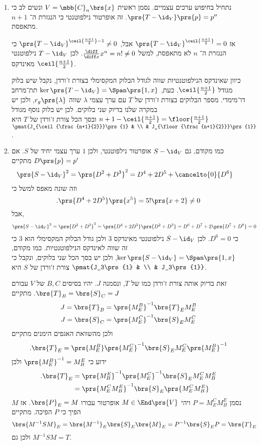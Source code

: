 \documentclass[a4paper,10pt,twoside,openany]{book}
\begin{document}
\begin{solution}
\begin{enumerate}
\item נתחיל בחיפוש ערכים עצמיים.
נסמן ראשית
$V = \mbb{C}_n\brs{x}$
ונשים לב כי
$\prs{T - \id_V}\prs{p} = p''$.
זה אופרטור נילפוטנטי כי הנגזרת ה־%
$n+1$
מתאפסת.

אז
$\prs{T - \id_V}^{\ceil{\frac{n+1}{2}}} = 0$
אבל,
$\prs{T - \id_V}^{\ceil{\frac{n+1}{2}} - 1} \neq 0$
כי הנגזרת ה־%
$n$
לא מתאפסת, למשל
$\frac{\diff}{\diff x} x^n = n! \neq 0$.
לכן
$T - \id_V$
נילפוטנטי מאינדקס
$\ceil{\frac{n+1}{2}}$.

כיוון שאינדקס הנילפוטנטיות שווה לגודל הבלוק המקסימלי בצורת ז'ורדן, נקבל שיש בלוק מגודל
$\ceil{\frac{n+1}{2}}$.
כעת,
$\ker\prs{T - \id_V} = \Span\prs{1,x}$
תת־מרחב דו־מימדי. מספר הבלוקים בצורת ז'ורדן של
$T$
עם ערך עצמי
$\lambda$
שווה
$r_g\prs{\lambda}$,
ולכן יש במקרה שלנו בדיוק שני בלוקים.
לכן יש בלוק נוסף מגודל
$n+1 - \ceil{\frac{n+1}{2}} = \floor{\frac{n+1}{2}}$
ובסך הכל צורת ז'ורדן של
$T$
היא
$\pmat{J_{\ceil{\frac{n+1}{2}}}\prs{1} & \\ & J_{\floor{\frac{n+1}{2}}}\prs{1}}$.

\item
כמו מקודם, גם
$S - \id_V$
אופרטור נילפוטנטי, ולכן
$1$
ערך עצמי יחיד של
$S$.
אם
$D\prs{p} = p'$
מתקיים
\begin{align*}
\prs{S - \id_V}^2 &= \prs{D^2 + D^3}^2 = D^4 + 2 D^5 + \cancelto{0}{D^6}
\end{align*}
וזה שונה מאפס למשל כי
\[\text{.} \prs{D^4 + 2 D^5}\prs{x^5} = 5! \prs{x + 2} \neq 0\]
אבל,
\[\prs{S - \id_V}^3 = \prs{D^2 + D^3}^3 = \prs{D^4 + 2D^5}\prs{D^2 + D^3} = D^6 + D^7 + 2\prs{D^7 + D^8} = 0\]
כי
$D^6 = 0$.
לכן
$S - \id_V$
נילפוטנטי מאינדקס
$3$
ולכן גודל הבלוק המקסימלי הוא
$3$
כי זה שווה לאינדקס הנילפוטנטיות.
כמו מקודם,
$\ker\prs{S - \id_V} = \Span\prs{1,x}$,
ולכן יש בסך הכל שני בלוקים, ונקבל כי צורת ז'ורדן של
$S$
היא
$\pmat{J_3\prs{1} & \\ & J_3\prs{1}}$.

זאת בדיוק אותה צורת ז'ורדן כמו של
$T$,
ונסמנה
$J$.
יהיו בסיסים
$B,C$
של
$V$
עבורם
$\brs{T}_B = \brs{S}_C = J$.
מתקיים
\begin{align*}
J =\brs{T}_B &= \prs{M^B_E}^{-1} \brs{T}_E M^B_E \\
J = \brs{S}_C &= \prs{M^C_E}^{-1} \brs{S}_E M^C_E
\end{align*}
ולכן מהשוואת האגפים הימנים מתקיים
\begin{align*}
\text{.} \brs{T}_E = \prs{M^B_E} \prs{M^C_E}^{-1} \brs{S}_E M^C_E \prs{M^B_E}^{-1}
\end{align*}
ידוע כי
$\prs{M^B_E}^{-1} = M^E_B$
ולכן
\begin{align*}
\text{.} \brs{T}_E &= \prs{M^E_B}^{-1} \prs{M^C_E}^{-1} \brs{S}_E M^C_E M^E_B
\\&= \prs{M^C_E M^E_B}^{-1} \brs{S}_E \prs{M^C_E M^E_B}
\end{align*}
נסמן
$P = M^C_E M^E_B$
ויהי
$M \in \End\prs{V}$
אופרטור עבורו
$\brs{P}_E = M$.
אז
$M$
הפיך כי
$P$
הפיכה. מתקיים
\[\brs{M^{-1} S M}_E = \brs{M^{-1}}_E \brs{S}_E \brs{M}_E = P^{-1} \brs{S}_E P = \brs{T}_E\]
ולכן גם
$M^{-1} S M = T$.
\end{enumerate}
\end{solution}
\end{document}
